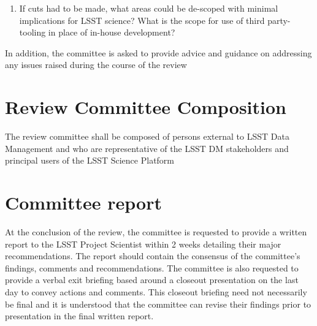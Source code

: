 \documentclass[DM,lsstdraft,STS,toc]{lsstdoc}
\begin{document}
\begin{enumerate}
%
\item If cuts had to be made, what areas could be de-scoped with minimal implications for LSST science? What is the scope for use of third party-tooling in place of in-house development? 
\color{red}{If DM-10 is invoked, or if the variant to freeze rather than eliminate the Portal is invoked, this question will be rephrased to reflect accordingly.}


\end{enumerate}

In addition, the committee is asked to provide advice and guidance on addressing any issues raised during the course of the review

\section{Review Committee Composition} 
The review committee shall be composed of persons external to LSST Data Management 
and who are representative of the LSST DM stakeholders and principal users of the LSST Science Platform 


\section{Committee report}
 At the conclusion of the review, the  committee is requested to provide a written report  to the LSST Project Scientist within 2 weeks  detailing 
their major recommendations.  The report should contain the consensus of the committee's findings, comments and recommendations. The committee is also requested to 
provide a verbal exit briefing based around a closeout presentation on the last day to convey actions and comments. This closeout briefing need not 
necessarily be final and it is understood that the committee can revise their findings prior to presentation in the final written report. 
\end{document}
